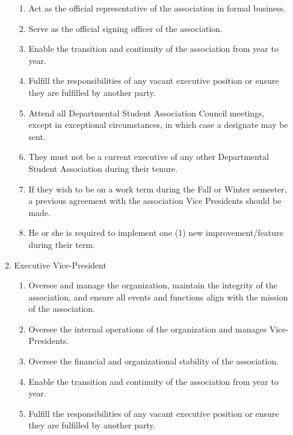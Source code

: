 \documentclass[12pt,a4paper]{article}
\begin{document}
\begin{enumerate}
\begin{enumerate}
\begin{enumerate}
\item Act as the official representative of the association in formal business.

\item Serve as the official signing officer of the association.

\item Enable the transition and continuity of the association from year to year.

\item Fulfill the responsibilities of any vacant executive position or ensure they are fulfilled by another party.

\item Attend all Departmental Student Association Council meetings, except in exceptional circumstances, in which case a designate may be sent.

\item They must not be a current executive of any other Departmental Student Association during their tenure.

\item If they wish to be on a work term during the Fall or Winter semester, a previous agreement with the association Vice Presidents should be made.

\item He or she is required to implement one (1) new improvement/feature during their term.
\end{enumerate}

\item Executive Vice-President

\begin{enumerate}
\item Oversee and manage the organization, maintain the integrity of the association, and ensure all events and functions align with the mission of the association.

\item Oversee the internal operations of the organization and manages Vice-Presidents.

\item Oversee the financial and organizational stability of the association.

\item Enable the transition and continuity of the association from year to year.

\item Fulfill the responsibilities of any vacant executive position or ensure they are fulfilled by another party.


\end{enumerate}
\end{enumerate}
\end{enumerate}
\end{document}
